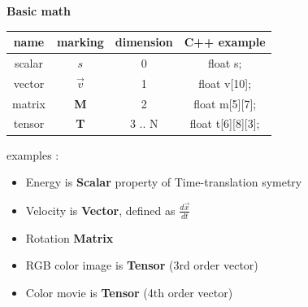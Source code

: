 \documentclass[xcolor=dvipsnames]{beamer}
\begin{document}
\begin{frame}{\bf Basic math}


\begin{table}[]
\begin{tabular}{|c|c|c|c|}
\hline
\textbf{name} & \textbf{marking}            & \textbf{dimension} & \textbf{C++ example}          \\ \hline
scalar        & $s$                         & 0                  & float s;                      \\ \hline
vector        & $\vec{v}$                   & 1                  & float v{[}10{]};              \\ \hline
matrix        & \bf{M} & 2                  & float m{[}5{]}{[}7{]};        \\ \hline
tensor        & \bf{T} & 3 .. N             & float t{[}6{]}{[}8{]}{[}3{]}; \\ \hline
\end{tabular}
\end{table}

examples :

\begin{itemize}

\item Energy is {\bf Scalar} property of Time-translation symetry
\item Velocity is {\bf Vector}, defined as $\frac{d\vec{x}}{dt}$
\item Rotation {\bf Matrix}
\item RGB color image is {\bf Tensor} (3rd order vector)
\item Color movie is {\bf Tensor} (4th order vector)

\end{itemize}
\end{frame}
\end{document}
